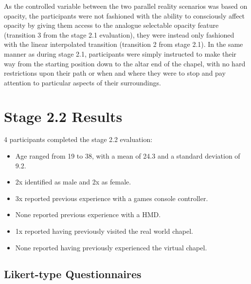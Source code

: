 As the controlled variable between the two parallel reality scenarios was based on opacity, the participants were not fashioned with the ability to consciously affect opacity by giving them access to the analogue selectable opacity feature (transition 3 from the stage 2.1 evaluation), they were instead only fashioned with the linear interpolated transition (transition 2 from stage 2.1). In the same manner as during stage 2.1, participants were simply instructed to make their way from the starting position down to the altar end of the chapel, with no hard restrictions upon their path or when and where they were to stop and pay attention to particular aspects of their surroundings.


\section{Stage 2.2 Results}

4 participants completed the stage 2.2 evaluation:
\begin{itemize}
	\item Age ranged from 19 to 38, with a mean of 24.3 and a standard deviation of 9.2.
	\item 2x identified as male and 2x as female.
	\item 3x reported previous experience with a games console controller.
	\item None reported previous experience with a HMD.
	\item 1x reported having previously visited the real world chapel.
	\item None reported having previously experienced the virtual chapel.
\end{itemize}


\subsection{Likert-type Questionnaires}

